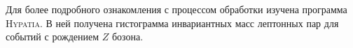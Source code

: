 \documentclass[12pt, a4paper]{article}
\begin{document}
Для более подробного ознакомления с процессом обработки изучена программа \textsc{Hypatia}. В ней получена гистограмма инвариантных масс лептонных пар для событий с рождением $Z$ бозона.
 






\end{document}
